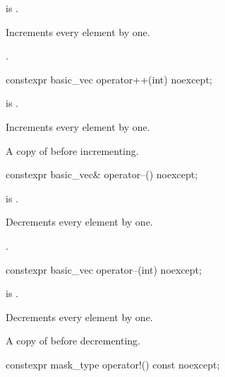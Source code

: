 \begin{itemdescr}
\pnum
\constraints
{} is .

\pnum
\effects
Increments every element by one.

\pnum
\returns
{}.
\end{itemdescr}

\begin{itemdecl}
constexpr basic_vec operator++(int) noexcept;
\end{itemdecl}

\begin{itemdescr}
\pnum
\constraints
{} is .

\pnum
\effects
Increments every element by one.

\pnum
\returns
A copy of  before incrementing.
\end{itemdescr}

\begin{itemdecl}
constexpr basic_vec& operator--() noexcept;
\end{itemdecl}

\begin{itemdescr}
\pnum
\constraints
{} is .

\pnum
\effects
Decrements every element by one.

\pnum
\returns
{}.
\end{itemdescr}

\begin{itemdecl}
constexpr basic_vec operator--(int) noexcept;
\end{itemdecl}

\begin{itemdescr}
\pnum
\constraints
{} is .

\pnum
\effects
Decrements every element by one.

\pnum
\returns
A copy of  before decrementing.
\end{itemdescr}

\begin{itemdecl}
constexpr mask_type operator!() const noexcept;
\end{itemdecl}

